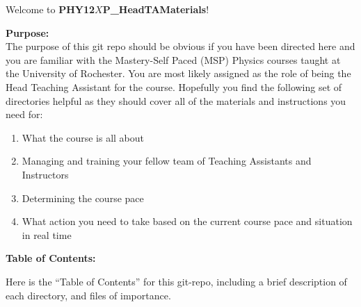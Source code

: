 \documentclass[12pt]{article}
\begin{document}
\begin{mdframed}[style=MyFrame]

\Large Welcome to \textbf{PHY12$X$P\_HeadTAMaterials}!

\hspace{10pt}

\noindent \textbf{Purpose:} \\
\small
\noindent The purpose of this git repo should be obvious if you have been directed here and you are familiar with the Mastery-Self Paced (MSP) Physics courses taught at the University of Rochester. You are most likely assigned as the role of being the Head Teaching Assistant for the course. Hopefully you find the following set of directories helpful as they should cover all of the materials and instructions  you need for:

\begin{enumerate}
	\item What the course is all about
	\item Managing and training your fellow team of Teaching Assistants and Instructors
	\item Determining the course pace
	\item What action you need to take based on the current course pace and situation in real time
\end{enumerate}

\Large
\noindent \textbf{Table of Contents:}

\small
\noindent Here is the ``Table of Contents'' for this git-repo, including a brief description of each directory, and files of importance. 


\end{mdframed}
\end{document}
